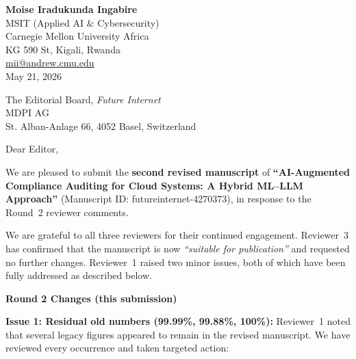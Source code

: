 \documentclass[12pt, a4paper]{article}
\begin{document}
\noindent
\textbf{Moise Iradukunda Ingabire}\\
MSIT (Applied AI \& Cybersecurity)\\
Carnegie Mellon University Africa\\
KG 590 St, Kigali, Rwanda\\
\href{mailto:mii@andrew.cmu.edu}{mii@andrew.cmu.edu}\\
May 21, 2026

\vspace{0.4cm}

\noindent
The Editorial Board, \textit{Future Internet}\\
MDPI AG\\
St. Alban-Anlage 66, 4052 Basel, Switzerland

\vspace{0.5cm}

\noindent Dear Editor,

\vspace{0.3cm}

We are pleased to submit the \textbf{second revised manuscript} of
\textbf{``AI-Augmented Compliance Auditing for Cloud Systems: A Hybrid ML--LLM Approach''}
(Manuscript ID: futureinternet-4270373), in response to the Round~2 reviewer comments.

We are grateful to all three reviewers for their continued engagement. Reviewer~3 has
confirmed that the manuscript is now \textit{``suitable for publication''} and requested
no further changes. Reviewer~1 raised two minor issues, both of which have been fully
addressed as described below.

\vspace{0.4cm}
\noindent\textbf{\large Round 2 Changes (this submission)}

\vspace{0.2cm}
\noindent\textbf{Issue 1: Residual old numbers (99.99\%, 99.88\%, 100\%):}
Reviewer~1 noted that several legacy figures appeared to remain in the revised manuscript.
We have reviewed every occurrence and taken targeted action:
\end{document}
